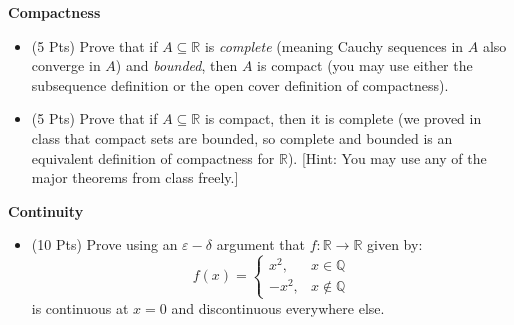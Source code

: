 \documentclass{article}
\begin{document}
    \newpage
    \textbf{Compactness}
    \begin{itemize}
        \item
            (5 Pts)
            Prove that if $A\subseteq\mathbb{R}$ is \textit{complete}
            (meaning Cauchy sequences in $A$ also converge in $A$) and
            \textit{bounded}, then $A$ is compact
            (you may use either the subsequence definition or the open cover
            definition of compactness).
        \item
            (5 Pts)
            Prove that if $A\subseteq\mathbb{R}$ is compact, then it is
            complete (we proved in class that compact sets are bounded, so
            complete and bounded is an equivalent definition of compactness
            for $\mathbb{R}$).
            [Hint: You may use any of the major theorems from class freely.]
    \end{itemize}
    \newpage
    \textbf{Continuity}
    \begin{itemize}
        \item (10 Pts)
            Prove using an $\varepsilon-\delta$ argument that
            $f:\mathbb{R}\rightarrow\mathbb{R}$ given by:
            \begin{equation}
                f(x)
                =
                \begin{cases}
                    x^{2},&x\in\mathbb{Q}\\
                    -x^{2},&x\not\in\mathbb{Q}
                \end{cases}
            \end{equation}
            is continuous at $x=0$ and discontinuous everywhere else.
    \end{itemize}
\end{document}
